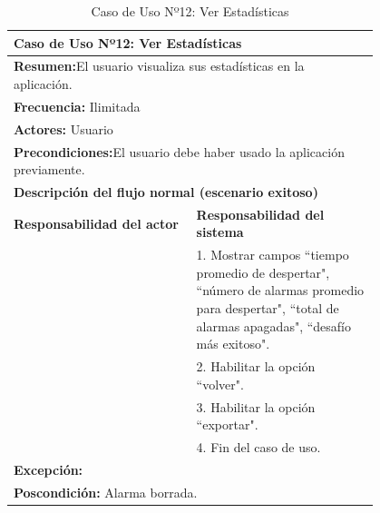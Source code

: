 \begin{table}[H]
    \centering
    \caption{Caso de Uso Nº12: Ver Estadísticas}
    \vspace{10pt}
    
    \begin{tabular}{| p{0.4\linewidth} | p{0.4\linewidth} |}
        \hline
        \multicolumn{2}{|l|}{\textbf{Caso de Uso Nº12:} Ver Estadísticas} \\
        \hline
        \multicolumn{2}{|l|}{\textbf{Resumen:}El usuario visualiza sus estadísticas en la aplicación.} \\
        \hline
        \multicolumn{2}{|l|}{\textbf{Frecuencia:}  Ilimitada} \\
        \hline
        \multicolumn{2}{|l|}{\textbf{Actores:}  Usuario} \\
        \hline
        \multicolumn{2}{|l|}{\textbf{Precondiciones:}El usuario debe haber usado la aplicación previamente.} \\
        \hline
        \multicolumn{2}{|l|}{\textbf{Descripción del flujo normal (escenario exitoso)} } \\
        \hline
        \textbf{Responsabilidad del actor} & \textbf{Responsabilidad del sistema}\\
            & 1. Mostrar campos ``tiempo promedio de despertar", ``número de alarmas promedio para despertar", ``total de alarmas apagadas", ``desafío más exitoso".\\
            & 2. Habilitar la opción ``volver". \\
            & 3. Habilitar la opción ``exportar".\\
            & 4. Fin del caso de uso. \\
        \hline
        \multicolumn{2}{|p{0.8\linewidth}|}{
                \textbf{Excepción:}}\\
        \hline
        \multicolumn{2}{|l|}{\textbf{Poscondición:}  Alarma borrada.} \\
        \hline
    \end{tabular}

    \label{table:12}
\end{table}
